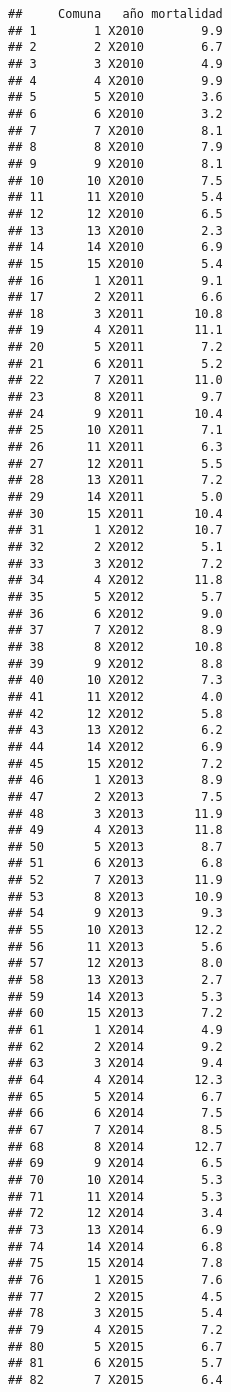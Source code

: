 \documentclass[]{book}
\theoremstyle{definition}
\theoremstyle{definition}
\theoremstyle{definition}
\theoremstyle{remark}
\begin{document}
\begin{verbatim}
##     Comuna   año mortalidad
## 1        1 X2010        9.9
## 2        2 X2010        6.7
## 3        3 X2010        4.9
## 4        4 X2010        9.9
## 5        5 X2010        3.6
## 6        6 X2010        3.2
## 7        7 X2010        8.1
## 8        8 X2010        7.9
## 9        9 X2010        8.1
## 10      10 X2010        7.5
## 11      11 X2010        5.4
## 12      12 X2010        6.5
## 13      13 X2010        2.3
## 14      14 X2010        6.9
## 15      15 X2010        5.4
## 16       1 X2011        9.1
## 17       2 X2011        6.6
## 18       3 X2011       10.8
## 19       4 X2011       11.1
## 20       5 X2011        7.2
## 21       6 X2011        5.2
## 22       7 X2011       11.0
## 23       8 X2011        9.7
## 24       9 X2011       10.4
## 25      10 X2011        7.1
## 26      11 X2011        6.3
## 27      12 X2011        5.5
## 28      13 X2011        7.2
## 29      14 X2011        5.0
## 30      15 X2011       10.4
## 31       1 X2012       10.7
## 32       2 X2012        5.1
## 33       3 X2012        7.2
## 34       4 X2012       11.8
## 35       5 X2012        5.7
## 36       6 X2012        9.0
## 37       7 X2012        8.9
## 38       8 X2012       10.8
## 39       9 X2012        8.8
## 40      10 X2012        7.3
## 41      11 X2012        4.0
## 42      12 X2012        5.8
## 43      13 X2012        6.2
## 44      14 X2012        6.9
## 45      15 X2012        7.2
## 46       1 X2013        8.9
## 47       2 X2013        7.5
## 48       3 X2013       11.9
## 49       4 X2013       11.8
## 50       5 X2013        8.7
## 51       6 X2013        6.8
## 52       7 X2013       11.9
## 53       8 X2013       10.9
## 54       9 X2013        9.3
## 55      10 X2013       12.2
## 56      11 X2013        5.6
## 57      12 X2013        8.0
## 58      13 X2013        2.7
## 59      14 X2013        5.3
## 60      15 X2013        7.2
## 61       1 X2014        4.9
## 62       2 X2014        9.2
## 63       3 X2014        9.4
## 64       4 X2014       12.3
## 65       5 X2014        6.7
## 66       6 X2014        7.5
## 67       7 X2014        8.5
## 68       8 X2014       12.7
## 69       9 X2014        6.5
## 70      10 X2014        5.3
## 71      11 X2014        5.3
## 72      12 X2014        3.4
## 73      13 X2014        6.9
## 74      14 X2014        6.8
## 75      15 X2014        7.8
## 76       1 X2015        7.6
## 77       2 X2015        4.5
## 78       3 X2015        5.4
## 79       4 X2015        7.2
## 80       5 X2015        6.7
## 81       6 X2015        5.7
## 82       7 X2015        6.4

\end{verbatim}
\end{document}
